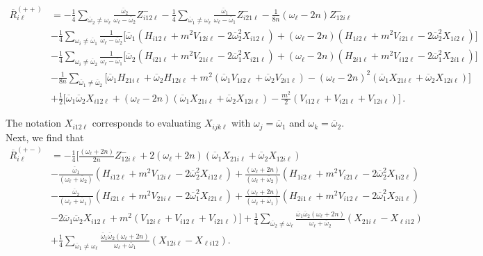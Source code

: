 \documentclass[letterpaper,11pt]{article}
\newcommand{\oi}{\omega_i}
\newcommand{\ol}{\omega_\ell}
\newcommand{\oone}{\overline{\omega}_1}
\newcommand{\otwo}{\overline{\omega}_2}
\begin{document}
\begin{align}
\label{R1}
\overline{R}^{(++)}_{i \ell} &= - \frac{1}{4} \sum_{\otwo \neq \ol} \frac{\otwo}{\ol - \otwo} Z^{-}_{i12\ell} - \frac{1}{4} \sum_{\oone \neq \ol} \frac{\oone}{\ol - \oone} Z^{-}_{i21\ell} - \frac{1}{8n} \left( \ol - 2n \right) Z^-_{12i\ell} \nonumber \\
%
& - \frac{1}{4} \sum_{\oi \neq \oone} \frac{1}{\ol - \otwo} \Big[ \oone \left( H_{i12\ell} + m^2 V_{12i\ell} - 2 \otwo^2 X_{i12\ell} \right) + (\ol - 2n) \left( H_{1i2\ell} + m^2 V_{i21\ell} - 2\otwo^2 X_{1i2\ell} \right)\Big] \nonumber \\
%
& - \frac{1}{4} \sum_{\oi \neq \otwo} \frac{1}{\ol - \oone} \Big[ \otwo \left( H_{i21\ell} + m^2 V_{21i\ell} - 2\oone^2 X_{i21\ell} \right) + (\ol - 2n) \left( H_{2i1\ell} + m^2 V_{i12\ell} - 2\oone^2 X_{2i1\ell} \right) \Big] \nonumber \\
%
& - \frac{1}{8n} \sum_{\oone \neq \otwo} \Big[ \oone H_{21i\ell} + \otwo H_{12i\ell} + m^2 \left( \oone V_{1i2\ell} + \otwo V_{2i1\ell} \right) - \left( \ol - 2n \right)^2 \left(\oone X_{21i\ell} + \otwo X_{12i\ell} \right) \Big] \nonumber \\
%
& + \frac{1}{2} \Big[ \oone\otwo X_{i12\ell} + \left( \ol - 2n \right)\left( \oone X_{21i\ell} + \otwo X_{12i\ell} \right) - \frac{m^2}{2} \left( V_{i12\ell} + V_{i21\ell} + V_{12i\ell} \right) \Big] \, .
\end{align}

The notation $X_{i12\ell}$ corresponds to evaluating $X_{ijk\ell}$ with $\omega_j = \oone$ and $\omega_k = \otwo$. Next, we find that
\begin{align}
\label{R2}
\overline{R}_{i \ell}^{(+-)} &= - \frac{1}{4} \Big[ \frac{(\ol + 2n)}{2n} Z^-_{12i\ell} + 2 (\ol + 2n) \left( \oone X_{21i\ell} + \otwo X_{12i\ell} \right) \nonumber \\
%
& -\frac{\oone}{(\ol + \otwo)} \left( H_{i12\ell} + m^2 V_{12i\ell} - 2 \otwo^2 X_{i12\ell} \right) + \frac{(\ol + 2n)}{(\ol + \otwo)} \left( H_{1i2\ell} + m^2 V_{i21\ell} - 2\otwo^2 X_{1i2\ell} \right)  \nonumber \\
%
&- \frac{\otwo}{(\ol + \oone)} \left( H_{i21\ell} + m^2 V_{21i\ell} - 2\oone^2 X_{i21\ell} \right) + \frac{(\ol + 2n)}{(\ol + \oone)} \left(H_{2i1\ell} + m^2 V_{i12\ell} - 2\oone^2 X_{2i1\ell} \right)  \nonumber \\
%
&  - 2 \oone\otwo X_{i12\ell} + m^2 \left( V_{12i\ell} + V_{i12\ell} + V_{i21\ell} \right) \Big] + \frac{1}{4} \sum_{\otwo \neq \ol} \frac{\oone\otwo(\ol + 2n)}{\ol + \otwo} \left( X_{21i\ell} - X_{\ell i 12} \right) \nonumber \\
%
& + \frac{1}{4} \sum_{\oone \neq \ol} \frac{\oone\otwo(\ol + 2n)}{\ol + \oone} \left( X_{12i\ell} - X_{\ell i 12} \right).
\end{align}
\end{document}
